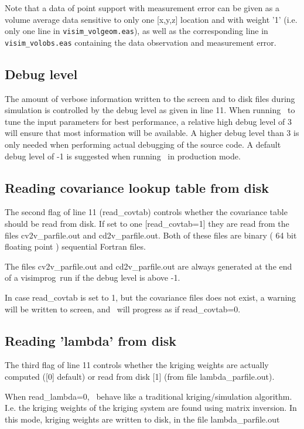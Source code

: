 \documentclass[12t]{article}
\begin{document}
Note that a data of point support with measurement error can be given as a volume average data sensitive to only one [x,y,z] location and with weight '1' (i.e. only one line in \texttt{visim\_volgeom.eas}), as well as the corresponding line in \texttt{visim\_volobs.eas} containing the data observation and measurement error.  

\subsection{Debug level}
The amount of verbose information written to the screen and to disk
files during simulation is controlled by the debug level as given in
line 11. When running \visimprog~to tune the input parameters for best
performance, a relative high debug level of 3 will ensure that most
information will be available. A higher debug level than 3 is only
needed when performing actual debugging of the source code.
A default debug level of -1 is suggested when running \visimprog~in
production mode.

\subsection{Reading covariance lookup table from disk}
The second flag of line 11 (read\_covtab) controls whether the covariance table should be read from disk. If set to one [read\_covtab=1] they are read from the files cv2v\_parfile.out and cd2v\_parfile.out. Both of these files are binary ( 64 bit floating point ) sequential Fortran files.

The files cv2v\_parfile.out and cd2v\_parfile.out are always generated at the end of a visimprog~run if the debug level is above -1.

In case read\_covtab is set to 1, but the covariance files does not exist, a warning will be written to screen, and \visimprog~will progress as if read\_covtab=0.
 

\subsection{Reading 'lambda' from disk}
The third flag of line 11 controls whether the kriging weights are actually computed ([0] default) or read from disk [1] (from file lambda\_parfile.out).

When read\_lambda=0, \visimprog~behave like a traditional kriging/simulation algorithm. I.e. the kriging weights of the kriging system are found using matrix inversion. In this mode, kriging weights are written to disk, in the file lambda\_parfile.out
\end{document}
